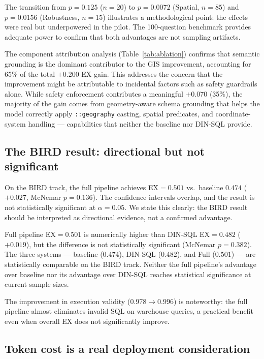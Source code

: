 \documentclass[11pt]{article}
\begin{document}
The transition from $p=0.125$ ($n=20$) to $p=0.0072$ (Spatial, $n=85$) and $p=0.0156$ (Robustness, $n=15$) illustrates a methodological point: the effects were real but underpowered in the pilot. The 100-question benchmark provides adequate power to confirm that both advantages are not sampling artifacts.

The component attribution analysis (Table~\ref{tab:ablation}) confirms that semantic grounding is the dominant contributor to the GIS improvement, accounting for 65\% of the total $+0.200$ EX gain. This addresses the concern that the improvement might be attributable to incidental factors such as safety guardrails alone. While safety enforcement contributes a meaningful $+0.070$ (35\%), the majority of the gain comes from geometry-aware schema grounding that helps the model correctly apply \texttt{::geography} casting, spatial predicates, and coordinate-system handling --- capabilities that neither the baseline nor DIN-SQL provide.

\subsection{The BIRD result: directional but not significant}

On the BIRD track, the full pipeline achieves EX$=0.501$ vs.\ baseline $0.474$ ($+0.027$, McNemar $p=0.136$). The confidence intervals overlap, and the result is not statistically significant at $\alpha=0.05$. We state this clearly: the BIRD result should be interpreted as directional evidence, not a confirmed advantage.

Full pipeline EX$=0.501$ is numerically higher than DIN-SQL EX$=0.482$ ($+0.019$), but the difference is not statistically significant (McNemar $p=0.382$). The three systems --- baseline ($0.474$), DIN-SQL ($0.482$), and Full ($0.501$) --- are statistically comparable on the BIRD track. Neither the full pipeline's advantage over baseline nor its advantage over DIN-SQL reaches statistical significance at current sample sizes.

The improvement in execution validity ($0.978 \to 0.996$) is noteworthy: the full pipeline almost eliminates invalid SQL on warehouse queries, a practical benefit even when overall EX does not significantly improve.

\subsection{Token cost is a real deployment consideration}
\end{document}
